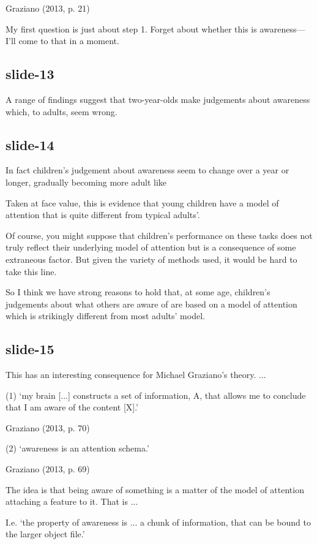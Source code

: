 \documentclass[14pt,\papersize]{extarticle}
\begin{document}
              
Graziano (2013, p. 21)

 
My first question is just about step 1.  Forget about whether this is
awareness---I'll come to that in a moment.
 
\subsection{slide-13}
A range of findings suggest that two-year-olds make judgements about
awareness which, to adults, seem wrong.
 
\subsection{slide-14}
In fact children's judgement about awareness seem to change over a year or
longer, gradually becoming more adult like
 
Taken at face value, this is evidence that young children have a model of
attention that is quite different from typical adults’.
 
Of course, you might suppose that children’s performance on these tasks 
does not truly reflect their underlying model of attention but is a
consequence of some extraneous factor.
But given the variety of methods used, it would be hard to take this line.
 
So I think we have strong reasons to hold that, at some age, children’s
judgements about what others are aware of are based on a model of attention
which is strikingly different from most adults’ model.
 
\subsection{slide-15}
This has an interesting consequence for Michael Graziano’s theory. ...
 
(1) ‘my brain [...] constructs a set of information, A, that allows me to 
conclude that I am aware of the content [X].’
            


            
Graziano (2013, p. 70)

 
(2) ‘awareness is an attention schema.’
            


            
Graziano (2013, p. 69)

 
The idea is that being aware of something is a matter of the
model of attention attaching a feature to it.
That is ...
 
I.e. ‘the property of awareness is ... a chunk of information, that can 
be bound to the larger 
object file.’
            
\end{document}
